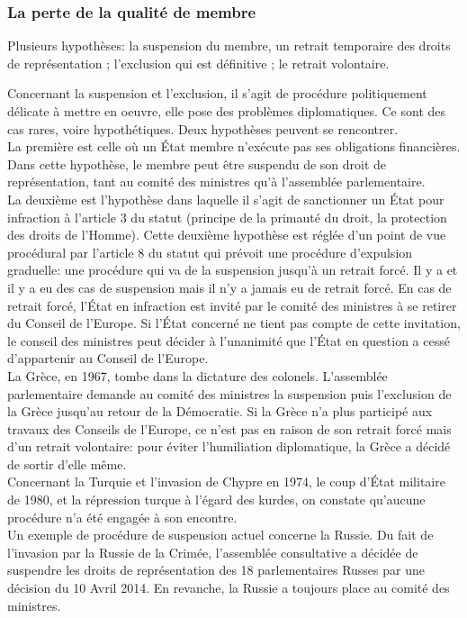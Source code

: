 \documentclass[10pt, a4paper, openany]{book}
\begin{document}
\subsubsection{La perte de la qualité de membre}

Plusieurs hypothèses: la suspension du membre, un retrait temporaire des droits de représentation ; l'exclusion qui est définitive ; le retrait volontaire.


Concernant la suspension et l'exclusion, il s'agit de procédure politiquement délicate à mettre en oeuvre, elle pose des problèmes diplomatiques. Ce sont des cas rares, voire hypothétiques. Deux hypothèses peuvent se rencontrer. \\
La première est celle où un État membre n'exécute pas ses obligations financières. Dans cette hypothèse, le membre peut être suspendu de son droit de représentation, tant au comité des ministres qu'à l'assemblée parlementaire. \\
La deuxième est l'hypothèse dans laquelle il s'agit de sanctionner un État pour infraction à l'article 3 du statut (principe de la primauté du droit, la protection des droits de l'Homme). Cette deuxième hypothèse est réglée d'un point de vue procédural par l'article 8 du statut qui prévoit une procédure d'expulsion graduelle: une procédure qui va de la suspension jusqu'à un retrait forcé. Il y a et il y a eu des cas de suspension mais il n'y a jamais eu de retrait forcé. En cas de retrait forcé, l'État en infraction est invité par le comité des ministres à se retirer du Conseil de l'Europe. Si l'État concerné ne tient pas compte de cette invitation, le conseil des ministres peut décider à l'unanimité que l'État en question a cessé d'appartenir au Conseil de l'Europe. \\
La Grèce, en 1967, tombe dans la dictature des colonels. L'assemblée parlementaire demande au comité des ministres la suspension puis l'exclusion de la Grèce jusqu'au retour de la Démocratie. Si la Grèce n'a plus participé aux travaux des Conseils de l'Europe, ce n'est pas en raison de son retrait forcé mais d'un retrait volontaire: pour éviter l'humiliation diplomatique, la Grèce a décidé de sortir d'elle même. \\
Concernant la Turquie et l'invasion de Chypre en 1974, le coup d'État militaire de 1980, et la répression turque à l'égard des kurdes, on constate qu'aucune procédure n'a été engagée à son encontre. \\
Un exemple de procédure de suspension actuel concerne la Russie. Du fait de l'invasion par la Russie de la Crimée, l'assemblée consultative a décidée de suspendre les droits de représentation des 18 parlementaires Russes par une décision du 10 Avril 2014. En revanche, la Russie a toujours place au comité des ministres.
\end{document}
